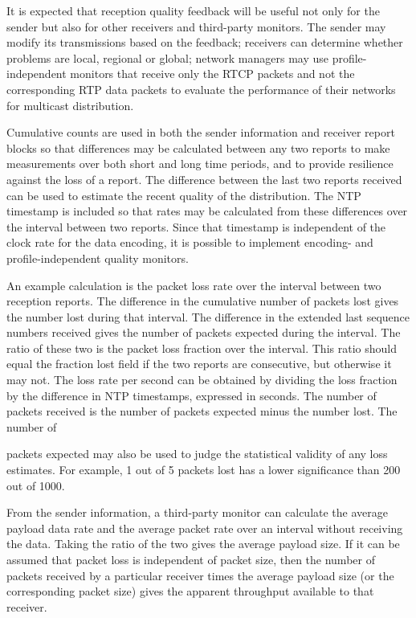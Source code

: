 \documentclass{article}
\begin{document}
It is expected that reception quality feedback will be useful not only for the sender but also for other receivers and third-party monitors.  The sender may modify its transmissions based on the feedback; receivers can determine whether problems are local, regional or global; network managers may use profile-independent monitors that receive only the RTCP packets and not the corresponding RTP data packets to evaluate the performance of their networks for multicast distribution.

Cumulative counts are used in both the sender information and receiver report blocks so that differences may be calculated between any two reports to make measurements over both short and long time periods, and to provide resilience against the loss of a report.  The difference between the last two reports received can be used to estimate the recent quality of the distribution.  The NTP timestamp is included so that rates may be calculated from these differences over the interval between two reports.  Since that timestamp is independent of the clock rate for the data encoding, it is possible to implement encoding- and profile-independent quality monitors.

An example calculation is the packet loss rate over the interval between two reception reports.  The difference in the cumulative number of packets lost gives the number lost during that interval. The difference in the extended last sequence numbers received gives the number of packets expected during the interval.  The ratio of these two is the packet loss fraction over the interval.  This ratio should equal the fraction lost field if the two reports are consecutive, but otherwise it may not.  The loss rate per second can be obtained by dividing the loss fraction by the difference in NTP timestamps, expressed in seconds.  The number of packets received is the number of packets expected minus the number lost.  The number of

packets expected may also be used to judge the statistical validity of any loss estimates.  For example, 1 out of 5 packets lost has a lower significance than 200 out of 1000.

From the sender information, a third-party monitor can calculate the average payload data rate and the average packet rate over an interval without receiving the data.  Taking the ratio of the two gives the average payload size.  If it can be assumed that packet loss is independent of packet size, then the number of packets received by a particular receiver times the average payload size (or the corresponding packet size) gives the apparent throughput available to that receiver.
\end{document}
